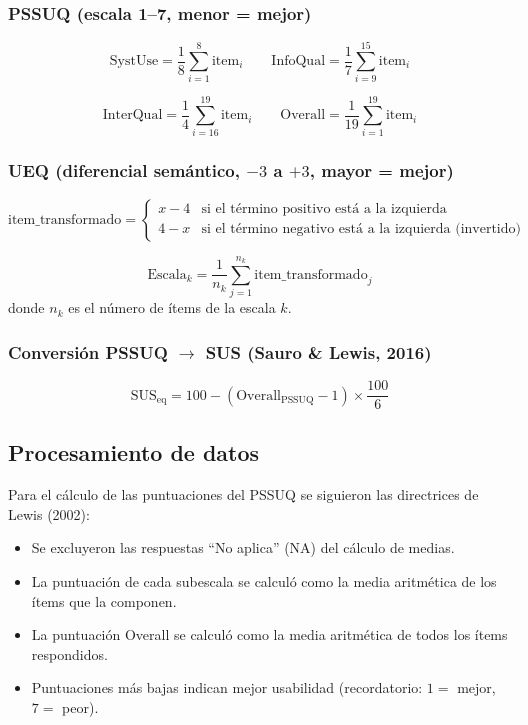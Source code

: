 \documentclass[a4paper,12pt]{report}
\begin{document}
\subsubsection*{PSSUQ (escala 1--7, menor = mejor)}

\[
\text{SystUse} = \frac{1}{8} \sum_{i=1}^{8} \text{item}_i \qquad
\text{InfoQual} = \frac{1}{7} \sum_{i=9}^{15} \text{item}_i
\]

\[
\text{InterQual} = \frac{1}{4} \sum_{i=16}^{19} \text{item}_i \qquad
\text{Overall} = \frac{1}{19} \sum_{i=1}^{19} \text{item}_i
\]

\subsubsection*{UEQ (diferencial semántico, $-3$ a $+3$, mayor = mejor)}

\[
\text{item\_transformado} =
\begin{cases}
x - 4 & \text{si el término positivo está a la izquierda} \\
4 - x & \text{si el término negativo está a la izquierda (invertido)}
\end{cases}
\]

\[
\text{Escala}_k = \frac{1}{n_k} \sum_{j=1}^{n_k} \text{item\_transformado}_j
\]
donde $n_k$ es el número de ítems de la escala $k$.

\subsubsection*{Conversión PSSUQ $\to$ SUS (Sauro \& Lewis, 2016)}

\[
\text{SUS}_{\text{eq}} = 100 - (\text{Overall}_{\text{PSSUQ}} - 1) \times \frac{100}{6}
\]

\subsection{Procesamiento de datos}

Para el cálculo de las puntuaciones del PSSUQ se siguieron las directrices de Lewis (2002):

\begin{itemize}
    \item Se excluyeron las respuestas ``No aplica'' (NA) del cálculo de medias.
    \item La puntuación de cada subescala se calculó como la media aritmética de los ítems que la componen.
    \item La puntuación Overall se calculó como la media aritmética de todos los ítems respondidos.
    \item Puntuaciones más bajas indican mejor usabilidad (recordatorio: $1 =$ mejor, $7 =$ peor).
\end{itemize}
\end{document}
